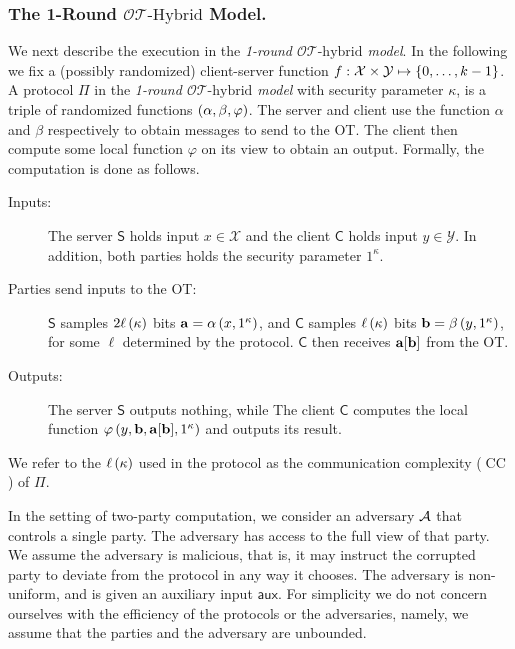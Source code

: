 \documentclass{llncs}
\newcommand{\OTfunc}{\mathcal{OT}}
\newcommand{\OThybrid}{\OTfunc\mbox{-}\text{hybrid}}
\newcommand{\OTHybrid}{\OTfunc\mbox{-}\text{Hybrid}}
\newcommand{\X}{\mathcal{X}}
\newcommand{\Y}{\mathcal{Y}}
\renewcommand{\Z}{\set{0,\ldots,k-1}}
\renewcommand{\b}{\myvec{b}}
\renewcommand{\a}{\myvec{a}}
\newcommand{\aux}{\mathsf{aux}}
\newcommand{\srvr}{\alpha}
\newcommand{\clnt}{\beta}
\newcommand{\local}{\varphi}
\newcommand{\CC}{\operatorname{CC}}
\renewcommand{\Sc}{\mathsf{S}}
\newcommand{\Cc}{\mathsf{C}}
\begin{document}
\subsubsection*{The 1-Round \texorpdfstring{$\OTHybrid$}{$\OTHybrid$} Model.}
We next describe the execution in the \emph{1-round $\OThybrid$ model}. In the following we fix a (possibly randomized) client-server function $f:\X\times\Y\mapsto\Z$. A protocol $\Pi$ in the \emph{1-round $\OThybrid$ model} with security parameter $\kappa$, is a triple of randomized functions $\vect{\srvr,\clnt,\local}$. The server and client use the function $\srvr$ and $\clnt$ respectively to obtain messages to send to the OT. The client then compute some local function $\local$ on its view to obtain an output. Formally, the computation is done as follows.
\begin{description}
\item[Inputs:] The server $\Sc$ holds input $x\in\X$ and the client $\Cc$ holds input $y\in\Y$. In addition, both parties holds the security parameter $1^{\kappa}$.

\item[Parties send inputs to the OT:] $\Sc$ samples $2\ell\left ( \kappa \right )$ bits $\myvec{a}=\srvr\of{x,1^{\kappa}}$, and $\Cc$ samples $\ell\left ( \kappa \right )$ bits $\myvec{b}=\clnt\of{y,1^{\kappa}}$, for some $\ell$ determined by the protocol. $\Cc$ then receives ${\bf a}[{\bf b}]$ from the OT.

\item[Outputs:] The server $\Sc$ outputs nothing, while The client $\Cc$ computes the local function $\local\of{y,\b,\a[\b],1^{\kappa}}$ and outputs its result.
\end{description}

We refer to the $\ell\left ( \kappa \right )$ used in the protocol as the communication complexity ($\CC$) of $\Pi$.

In the setting of two-party computation, we consider an adversary $\mathcal{A}$ that controls a single party. The adversary has access to the full view of that party. We assume the adversary is malicious, that is, it may instruct the corrupted party to deviate from the protocol in any way it chooses. The adversary is non-uniform, and is given an auxiliary input $\aux$. %
For simplicity we do not concern ourselves with the efficiency of the protocols or the adversaries, namely, we assume that the parties and the adversary are unbounded.
\end{document}
